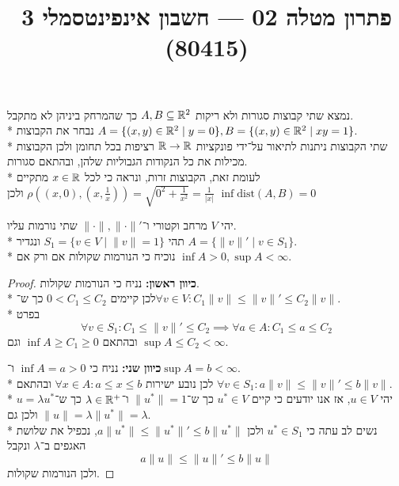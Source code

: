 
\title{פתרון מטלה 02 --- חשבון אינפינטסמלי 3 (80415)}


\maketitle
\maketitleprint{}

\Question{}
נמצא שתי קבוצות סגורות ולא ריקות $A, B \subseteq \mathbb{R}^2$ כך שהמרחק ביניהן לא מתקבל. \\*
נבחר את הקבוצות $A = \{ (x, y) \in \mathbb{R}^2 \mid y = 0\}, B = \{ (x, y) \in \mathbb{R}^2 \mid x y = 1 \}$. \\*
שתי הקבוצות ניתנות לתיאור על־ידי פונקציות $\mathbb{R} \to \mathbb{R}$ רציפות בכל תחומן ולכן הקבוצות מכילות את כל הנקודות הגבוליות שלהן, ובהתאם סגורות. \\*
לעומת זאת, הקבוצות זרות, ונראה כי לכל $x \in \mathbb{R}$ מתקיים $\rho((x, 0), (x, \frac{1}{x})) = \sqrt{0^2 + \frac{1}{x^2}} = \frac{1}{|x|}$ ולכן $\inf \text{dist}(A, B) = 0$

\Question{}
יהי $V$ מרחב וקטורי ו־$\lVert \cdot \rVert, \lVert \cdot \rVert'$ שתי נורמות עליו. \\*
תהי $S_1 = \{ v \in V \mid \lVert v \rVert = 1 \}$ ונגדיר $A = \{ \lVert v\rVert' \mid v \in S_1\}$. \\*
נוכיח כי הנורמות שקולות אם ורק אם $\inf A > 0, \sup A < \infty$.
\begin{proof}
	\textbf{כיוון ראשון:}
	נניח כי הנורמות שקולות. \\*
	לכן קיימים $0 < C_1 \le C_2$ כך ש־$\forall v \in V : C_1 \lVert v \rVert \le \lVert v \rVert' \le C_2 \lVert v \rVert$. \\*
	בפרט
	\[
		\forall v \in S_1 : C_1 \le \lVert v \rVert' \le C_2
		\implies \forall a \in A : C_1 \le a \le C_2
	\]
	ובהתאם $\inf A \ge C_1 \ge 0$ וגם $\sup A \le C_2 < \infty$.

	\textbf{כיוון שני:}
	נניח כי $\inf A = a > 0$ ו־$\sup A = b < \infty$. \\*
	לכן נובע ישירות $\forall x \in A : a \le x \le b$ ובהתאם $\forall v \in S_1 : a \lVert v \rVert \le \lVert v \rVert' \le b \lVert v \rVert$. \\*
	יהי $u \in V$, אז אנו יודעים כי קיים $u^* \in V$ כך ש־$\lVert u^* \rVert = 1$ ו־$\lambda \in \mathbb{R}^+$ כך ש־$u = \lambda u^*$ ולכן גם $\lVert u \rVert = \lambda \lVert u^* \rVert = \lambda$. \\*
	נשים לב עתה כי $u^* \in S_1$ ולכן $a \lVert u^* \rVert \le \lVert u^* \rVert' \le b \lVert u^* \rVert$, נכפיל את שלושת האגפים ב־$\lambda$ ונקבל
	\[
		a \lVert u \rVert \le \lVert u \rVert' \le b \lVert u \rVert
	\]
	ולכן הנורמות שקולות.
\end{proof}

